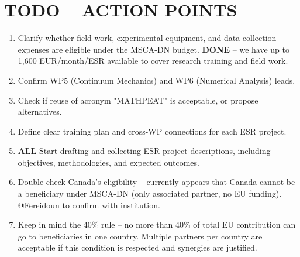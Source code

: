 \documentclass[12pt]{article}
\begin{document}
\section*{TODO – ACTION POINTS}
\begin{enumerate}
    \item Clarify whether field work, experimental equipment, and data collection expenses are eligible under the MSCA-DN budget. \textbf{DONE} – we have up to 1,600 EUR/month/ESR available to cover research training and field work.
    \item Confirm WP5 (Continuum Mechanics) and WP6 (Numerical Analysis) leads.
    \item Check if reuse of acronym "MATHPEAT" is acceptable, or propose alternatives.
    \item Define clear training plan and cross-WP connections for each ESR project.
    \item \textbf{ALL} Start drafting and collecting ESR project descriptions, including objectives, methodologies, and expected outcomes.
    \item Double check Canada’s eligibility – currently appears that Canada cannot be a beneficiary under MSCA-DN (only associated partner, no EU funding). @Fereidoun to confirm with institution.
    \item Keep in mind the 40\% rule – no more than 40\% of total EU contribution can go to beneficiaries in one country. Multiple partners per country are acceptable if this condition is respected and synergies are justified.
\end{enumerate}
\end{document}
